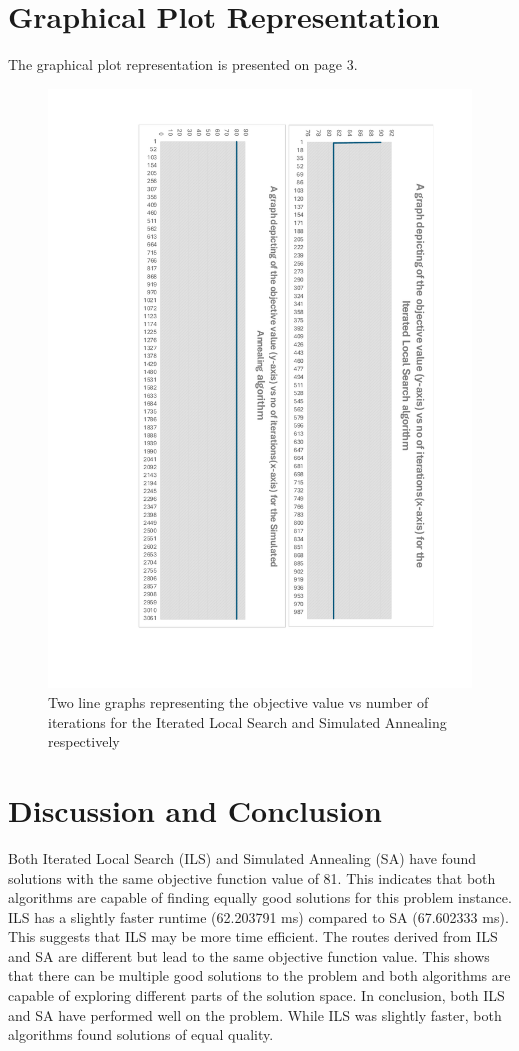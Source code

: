 \documentclass{article}
\begin{document}
\section{Graphical Plot Representation}
The graphical plot representation is presented on page 3.

\begin{figure}
    \centering
    \includegraphics[width=1\textwidth]{graphical_plot_diagram.pdf}
    \caption{Two line graphs representing the objective value vs number of iterations for the Iterated Local Search and Simulated Annealing respectively}
    \label{fig:excel_graph}
\end{figure}

\section{Discussion and Conclusion}
Both Iterated Local Search (ILS) and Simulated Annealing (SA) have found solutions with the same objective function value of 81. This indicates that both algorithms are capable of finding equally good solutions for this problem instance. ILS has a slightly faster runtime (62.203791 ms) compared to SA (67.602333 ms). This suggests that ILS may be more time efficient. The routes derived from ILS and SA are different but lead to the same objective function value. This shows that there can be multiple good solutions to the problem and both algorithms are capable of exploring different parts of the solution space. In conclusion, both ILS and SA have performed well on the problem. While ILS was slightly faster, both algorithms found solutions of equal quality.
\end{document}
